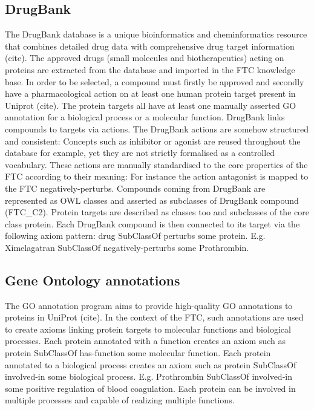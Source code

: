 \documentclass{bioinfo}
\begin{document}
\subsection{DrugBank}
The DrugBank database is a unique bioinformatics and cheminformatics resource 
that combines detailed drug data with comprehensive drug target information (cite). The approved 
drugs (small molecules and biotherapeutics) acting on proteins are extracted from the database and 
imported in the FTC knowledge base. In order to be selected, a compound must firstly be approved and 
secondly have a pharmacological action on at least one human protein target present in Uniprot (cite). 
The protein targets all have at least one manually asserted GO annotation for a biological process or a 
molecular function. DrugBank links compounds to targets via actions. The DrugBank actions are somehow 
structured and consistent: Concepts such as inhibitor or agonist are reused throughout the database for 
example, yet they are not strictly formalised as a controlled vocabulary. These actions are manually 
standardised to the core properties of the FTC according to their meaning: For instance the action 
antagonist is mapped to the FTC negatively-perturbs.
Compounds coming from DrugBank are represented as OWL classes and asserted 
as subclasses of DrugBank compound (FTC\_C2). Protein targets are described as classes 
too and subclasses of the core class protein. Each DrugBank compound is then connected to 
its target via the following axiom pattern: drug SubClassOf perturbs some protein. 
E.g. Ximelagatran SubClassOf negatively-perturbs some Prothrombin.

\subsection{Gene Ontology annotations}
The GO annotation program aims to provide high-quality GO annotations to 
proteins in UniProt (cite). In the context of the FTC, such annotations are used 
to create axioms linking protein targets to molecular functions and biological processes. 
Each protein annotated with a function creates an axiom such 
as protein SubClassOf has-function some molecular function. 
Each protein annotated to a biological process creates an axiom such 
as protein SubClassOf involved-in some biological process. 
E.g. Prothrombin SubClassOf involved-in some positive regulation of blood coagulation. 
Each protein can be involved in multiple processes and capable of realizing multiple functions.
\end{document}
